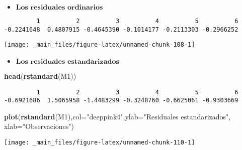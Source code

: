 \documentclass[
  a4paper,
  oneside,
  openany]{book}
\newenvironment{Shaded}{\begin{snugshade}}{\end{snugshade}}
\newcommand{\AttributeTok}[1]{\textcolor[rgb]{0.13,0.29,0.53}{#1}}
\newcommand{\FunctionTok}[1]{\textcolor[rgb]{0.13,0.29,0.53}{\textbf{#1}}}
\newcommand{\NormalTok}[1]{#1}
\newcommand{\SpecialCharTok}[1]{\textcolor[rgb]{0.81,0.36,0.00}{\textbf{#1}}}
\newcommand{\StringTok}[1]{\textcolor[rgb]{0.31,0.60,0.02}{#1}}
\providecommand{\tightlist}{%
  \setlength{\itemsep}{0pt}\setlength{\parskip}{0pt}}
\begin{document}
\begin{itemize}
\tightlist
\item
  \(\textbf{Los residuales ordinarios}\)
\end{itemize}

\begin{Shaded}
\end{Shaded}

\begin{verbatim}
         1          2          3          4          5          6 
-0.2241648  0.4807915 -0.4645390 -0.1014177 -0.2113303 -0.2966252 
\end{verbatim}

\begin{center}\texttt{[image: \_main\_files/figure-latex/unnamed-chunk-108-1]} \end{center}

\begin{itemize}
\tightlist
\item
  \(\textbf{Los residuales estandarizados}\)
\end{itemize}

\begin{Shaded}
\begin{Highlighting}[]
\FunctionTok{head}\NormalTok{(}\FunctionTok{rstandard}\NormalTok{(M1))}
\end{Highlighting}
\end{Shaded}

\begin{verbatim}
         1          2          3          4          5          6 
-0.6921686  1.5065958 -1.4483299 -0.3248760 -0.6625061 -0.9303669 
\end{verbatim}

\begin{Shaded}
\begin{Highlighting}[]
\FunctionTok{plot}\NormalTok{(}\FunctionTok{rstandard}\NormalTok{(M1),}\AttributeTok{col=}\StringTok{"deeppink4"}\NormalTok{,}\AttributeTok{ylab=}\StringTok{"Residuales estandarizados"}\NormalTok{, }\AttributeTok{xlab=}\StringTok{"Observaciones"}\NormalTok{)}
\end{Highlighting}
\end{Shaded}

\begin{center}\texttt{[image: \_main\_files/figure-latex/unnamed-chunk-110-1]} \end{center}
\end{document}
